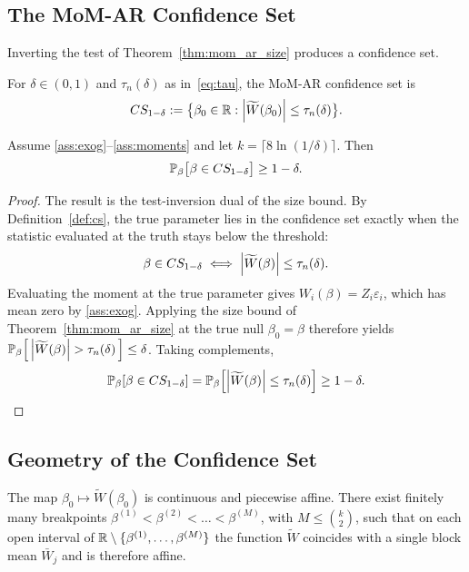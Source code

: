 \subsection{The MoM-AR Confidence Set}
\label{sec:mom_ar_cs}

Inverting the test of Theorem~\ref{thm:mom_ar_size} produces a confidence set.

\begin{definition}
\label{def:cs}
For $\delta\in(0,1)$ and $\tau_n(\delta)$ as in~\eqref{eq:tau}, the MoM-AR
confidence set is
\begin{equation}
  CS_{1-\delta}
    := \bigl\{\beta_0\in\mathbb{R} : \left|\widetilde{W}(\beta_0)\right|\le\tau_n(\delta)\bigr\}.
  \label{eq:cs}
\end{equation}
\end{definition}


\begin{theorem}[Coverage]
\label{thm:coverage}
Assume \ref{ass:exog}--\ref{ass:moments} and let
$k=\lceil 8\ln(1/\delta)\rceil$. Then
\[
  \operatorname{\mathbb{P}}_{\beta}\bigl[\beta\in CS_{1-\delta}\bigr] \ge 1-\delta.
\]
\end{theorem}

\begin{proof}
The result is the test-inversion dual of the size bound. By Definition~\ref{def:cs}, the true parameter lies in the confidence set exactly when the statistic evaluated at the truth stays below the threshold:
\[
    \beta\in CS_{1-\delta} \iff \left|\widetilde{W}(\beta)\right|\le\tau_n(\delta).
\]
Evaluating the moment at the true parameter gives $W_i(\beta) = Z_i\varepsilon_i$, which has mean zero by \ref{ass:exog}. Applying the size bound of Theorem~\ref{thm:mom_ar_size} at the true null $\beta_0=\beta$ therefore yields $\Prob_\beta\!\left[\,\abs{\widetilde{W}(\beta)}>\tau_n(\delta)\,\right]\le\delta$. Taking complements,
\[
    \operatorname{\mathbb{P}}_\beta\!\left[\beta\in CS_{1-\delta}\right]
    = \operatorname{\mathbb{P}}_\beta\!\left[\left|\widetilde{W}(\beta)\right|\le\tau_n(\delta)\right]
    \ge 1-\delta. \qedhere
\]
\end{proof}

\subsection{Geometry of the Confidence Set}
\label{sec:geometry}

\begin{theorem}
\label{thm:piecewise}
The map $\beta_0\mapsto\widetilde{W}(\beta_0)$ is continuous and piecewise affine. There exist finitely many breakpoints $\beta^{(1)}<\beta^{(2)}<\dots<\beta^{(M)}$, with $M\le\binom{k}{2}$, such that on each open interval of $\mathbb{R}\setminus\{\beta^{(1)},\dots,\beta^{(M)}\}$ the function $\widetilde{W}$ coincides with a single block mean $\bar{W}_j$ and is therefore affine.
\end{theorem}

